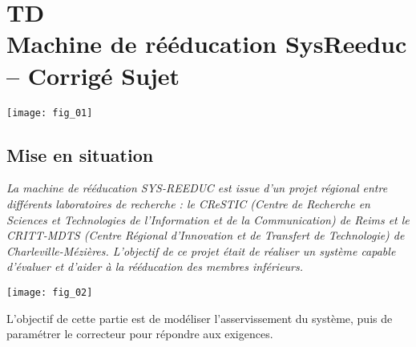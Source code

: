 \chapter*{TD  \\ 
Machine de rééducation SysReeduc -- 
\ifprof Corrigé \else Sujet \fi}

\iflivret {} \else
\ifprof  {} \else \fi
\fi

\setcounter{question}{0}

\begin{marginfigure} [4cm]
\centering
\texttt{[image: fig\_01]}
\end{marginfigure}


\section*{Mise en situation}

\ifprof
\else

\textit{La machine de rééducation SYS-REEDUC est issue d'un projet régional entre différents laboratoires de recherche : le CReSTIC (Centre de Recherche en Sciences et Technologies de l'Information et de la Communication) de Reims et le CRITT-MDTS (Centre Régional d'Innovation et de Transfert de Technologie) de Charleville-Mézières. L'objectif de ce projet était de réaliser un système capable d'évaluer et d'aider à la rééducation des membres inférieurs.}


\begin{marginfigure}[6cm]
\texttt{[image: fig\_02]}
\end{marginfigure}

\begin{obj}
L'objectif de cette partie est de modéliser l'asservissement du système, puis de paramétrer le correcteur pour répondre aux exigences.
\end{obj}

